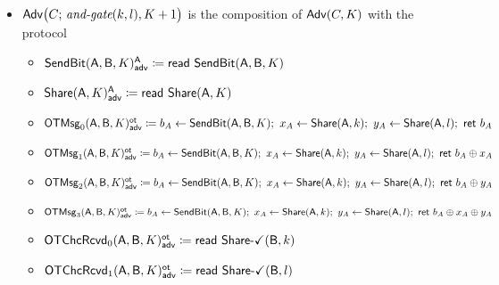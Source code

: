 \begin{itemize}
\item $\Adv\big(C; \, \andgate(k,l),K+1\big)$ is the composition of $\Adv(C,K)$ with the protocol
\begin{itemize}
\item {\color{blue} $\LeakSendBit(\A,\B,K)^\A_\adv \coloneqq \read{\SendBit(\A,\B,K)}$}
\item {\color{blue} $\LeakShare(\A,K)^\A_\adv \coloneqq \read{\Share(\A,K)}$}\smallskip
\item {\color{blue} $\LeakOTMsg_0(\A,\B,K)^\ot_\adv \coloneqq b_A \leftarrow \SendBit(\A,\B,K); \ x_A \leftarrow \Share(\A,k); \ y_A \leftarrow \Share(\A,l); \ \ret{b_A}$}
\item {\color{blue} $\LeakOTMsg_1(\A,\B,K)^\ot_\adv \coloneqq b_A \leftarrow \SendBit(\A,\B,K); \ x_A \leftarrow \Share(\A,k); \ y_A \leftarrow \Share(\A,l); \ \ret{b_A \oplus x_A}$}
\item {\color{blue} $\LeakOTMsg_2(\A,\B,K)^\ot_\adv \coloneqq b_A \leftarrow \SendBit(\A,\B,K); \ x_A \leftarrow \Share(\A,k); \ y_A \leftarrow \Share(\A,l); \ \ret{b_A \oplus y_A}$}
\item {\color{blue} $\LeakOTMsg_3(\A,\B,K)^\ot_\adv \coloneqq b_A \leftarrow \SendBit(\A,\B,K); \ x_A \leftarrow \Share(\A,k); \ y_A \leftarrow \Share(\A,l); \ \ret{b_A \oplus x_A \oplus y_A}$}\smallskip
\item {\color{blue} $\LeakOTChcRcvd_0(\A,\B,K)^\ot_\adv \coloneqq \read{\ShareOk(\B,k)}$}
\item {\color{blue} $\LeakOTChcRcvd_1(\A,\B,K)^\ot_\adv \coloneqq \read{\ShareOk(\B,l)}$}
\end{itemize}
\end{itemize}

